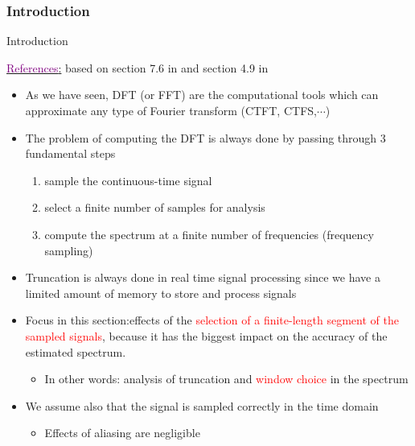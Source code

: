 \documentclass{beamer}
\begin{document}
\subsubsection{Introduction}
\begin{frame}[t,allowframebreaks]{Introduction}

\underline{\textcolor{purple}{References}:} based on section 7.6 in \cite{DSP_DimitrisManolakis} and section 4.9 in \cite{signal_processing_Lathi}

\begin{itemize}

\item As we have seen, DFT (or FFT) are the computational tools which can approximate any type of Fourier transform (CTFT, CTFS,$\cdots$)

\item The problem of computing the DFT is always done by passing through 3 fundamental steps

	\begin{enumerate}
	\item sample the continuous-time signal
	
	\item select a finite number of samples for analysis
	
	\item compute the spectrum at a finite
number of frequencies (frequency sampling)
	\end{enumerate}


\item Truncation is always done in real time signal processing since we have a limited amount of memory to store and process signals

\newpage
\item Focus in this section:effects of the \textcolor{red}{selection of a finite-length segment of the sampled signals}, because it
has the biggest impact on the accuracy of the estimated spectrum.

	\begin{itemize}
	\item In other words:  analysis of truncation and \textcolor{red}{window choice} in the spectrum
	\end{itemize}


\item We assume also that the signal is sampled correctly in the time domain
	\begin{itemize}
	\item Effects of aliasing are negligible 
	\end{itemize}

\end{itemize}

\end{frame}
\end{document}
